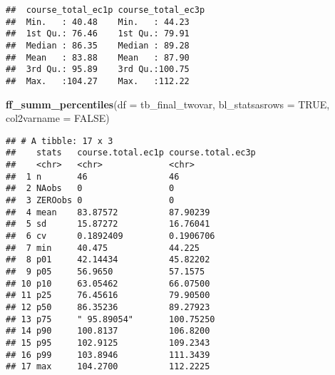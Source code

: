 \documentclass[
]{article}
\newenvironment{Shaded}{\begin{snugshade}}{\end{snugshade}}
\newcommand{\DataTypeTok}[1]{\textcolor[rgb]{0.13,0.29,0.53}{#1}}
\newcommand{\KeywordTok}[1]{\textcolor[rgb]{0.13,0.29,0.53}{\textbf{#1}}}
\newcommand{\NormalTok}[1]{#1}
\newcommand{\OperatorTok}[1]{\textcolor[rgb]{0.81,0.36,0.00}{\textbf{#1}}}
\newcommand{\OtherTok}[1]{\textcolor[rgb]{0.56,0.35,0.01}{#1}}
\newcommand{\StringTok}[1]{\textcolor[rgb]{0.31,0.60,0.02}{#1}}
\begin{document}
\begin{Shaded}
\end{Shaded}

\begin{verbatim}
##  course_total_ec1p course_total_ec3p
##  Min.   : 40.48    Min.   : 44.23   
##  1st Qu.: 76.46    1st Qu.: 79.91   
##  Median : 86.35    Median : 89.28   
##  Mean   : 83.88    Mean   : 87.90   
##  3rd Qu.: 95.89    3rd Qu.:100.75   
##  Max.   :104.27    Max.   :112.22
\end{verbatim}

\begin{Shaded}
\begin{Highlighting}[]
\KeywordTok{ff_summ_percentiles}\NormalTok{(}\DataTypeTok{df =}\NormalTok{ tb_final_twovar, }\DataTypeTok{bl_statsasrows =} \OtherTok{TRUE}\NormalTok{, }\DataTypeTok{col2varname =} \OtherTok{FALSE}\NormalTok{)}
\end{Highlighting}
\end{Shaded}

\begin{verbatim}
## # A tibble: 17 x 3
##    stats   course.total.ec1p course.total.ec3p
##    <chr>   <chr>             <chr>            
##  1 n       46                46               
##  2 NAobs   0                 0                
##  3 ZEROobs 0                 0                
##  4 mean    83.87572          87.90239         
##  5 sd      15.87272          16.76041         
##  6 cv      0.1892409         0.1906706        
##  7 min     40.475            44.225           
##  8 p01     42.14434          45.82202         
##  9 p05     56.9650           57.1575          
## 10 p10     63.05462          66.07500         
## 11 p25     76.45616          79.90500         
## 12 p50     86.35236          89.27923         
## 13 p75     " 95.89054"       100.75250        
## 14 p90     100.8137          106.8200         
## 15 p95     102.9125          109.2343         
## 16 p99     103.8946          111.3439         
## 17 max     104.2700          112.2225
\end{verbatim}
\end{document}
